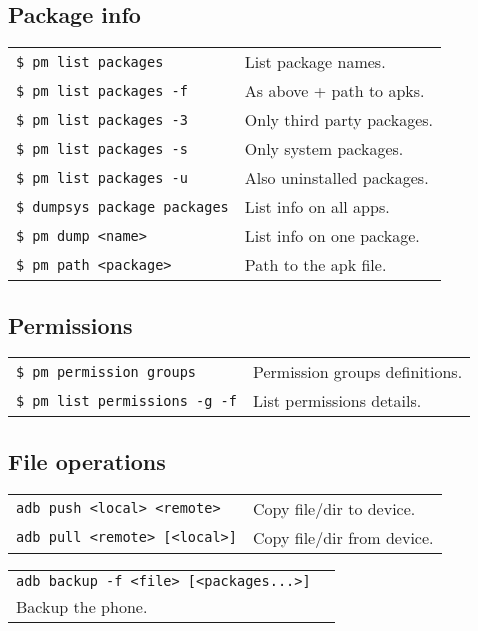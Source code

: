 \documentclass[11pt,landscape,a4paper]{article}
\begin{document}
\begin{multicols}{3}
\subsection{Package info}
\begin{tabular}{@{}ll@{}}
\texttt{\$ pm list packages} & List package names. \\
\texttt{\$ pm list packages -f} & As above + path to apks. \\
\texttt{\$ pm list packages -3} & Only third party packages. \\
\texttt{\$ pm list packages -s} & Only system packages. \\
\texttt{\$ pm list packages -u} & Also uninstalled packages. \\
\texttt{\$ dumpsys package packages} & List info on all apps. \\
\texttt{\$ pm dump <name>}   & List info on one package. \\
\texttt{\$ pm path <package>}  &  Path to the apk file.\\
\end{tabular}

\subsection{Permissions}
\begin{tabular}{@{}ll@{}}
\texttt{\$ pm permission groups}  &  Permission groups definitions. \\
\texttt{\$ pm list permissions -g -f}  &  List permissions details.\\
\end{tabular}

\subsection{File operations}
\begin{tabular}{@{}ll@{}}
\texttt{adb push <local> <remote>} & Copy file/dir to device.\\
\texttt{adb pull <remote> [<local>]}  & Copy file/dir from device.\\
\end{tabular}
\begin{tabular}{@{}ll@{}}
\texttt{adb backup -f <file>  [<packages...>]}  & \\
\hspace*{5cm}Backup the phone.&\\
\end{tabular}



\end{multicols}
\end{document}
